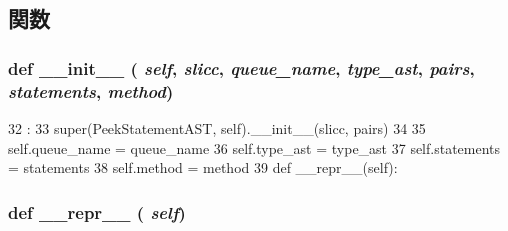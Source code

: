 \subsection{関数}
\hypertarget{classslicc_1_1ast_1_1PeekStatementAST_1_1PeekStatementAST_ac775ee34451fdfa742b318538164070e}{
\subsubsection[{\_\-\_\-init\_\-\_\-}]{\setlength{\rightskip}{0pt plus 5cm}def \_\-\_\-init\_\-\_\- ( {\em self}, \/   {\em slicc}, \/   {\em queue\_\-name}, \/   {\em type\_\-ast}, \/   {\em pairs}, \/   {\em statements}, \/   {\em method})}}
\label{classslicc_1_1ast_1_1PeekStatementAST_1_1PeekStatementAST_ac775ee34451fdfa742b318538164070e}



\begin{DoxyCode}
32                                                                               :
33         super(PeekStatementAST, self).__init__(slicc, pairs)
34 
35         self.queue_name = queue_name
36         self.type_ast = type_ast
37         self.statements = statements
38         self.method = method
39 
    def __repr__(self):
\end{DoxyCode}
\hypertarget{classslicc_1_1ast_1_1PeekStatementAST_1_1PeekStatementAST_ad8b9328939df072e4740cd9a63189744}{
\subsubsection[{\_\-\_\-repr\_\-\_\-}]{\setlength{\rightskip}{0pt plus 5cm}def \_\-\_\-repr\_\-\_\- ( {\em self})}}
\label{classslicc_1_1ast_1_1PeekStatementAST_1_1PeekStatementAST_ad8b9328939df072e4740cd9a63189744}



